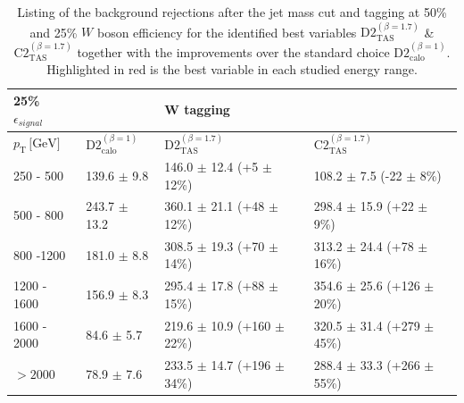 \begin{table}[]
\begin{tabular}{llll}
 \multicolumn{1}{l||}{  \textbf{25\% $\epsilon_{signal}$}} &                                                &  \textbf{W tagging}                                         &                                          \\ \hline
\multicolumn{1}{l||}{$p_{\mathrm{T}} \, \text{[GeV]}$}           & \multicolumn{1}{l|}{$\text{D2}_{\text{calo}}^{(\beta=1)}$} & \multicolumn{1}{l|}{$\text{D2}_{\text{TAS}}^{(\beta=1.7)}$} & \multicolumn{1}{l|}{$\text{C2}_{\text{TAS}}^{(\beta=1.7)}$} \\ \hline \hline
\multicolumn{1}{l||}{250 - 500}                       & \multicolumn{1}{l|}{139.6 $\pm$ 9.8}                     	& \multicolumn{1}{l|}{\cellcolor{Red!50}146.0 $\pm$ 12.4 (+5 $\pm$ 12\%)}         & \multicolumn{1}{l|}{108.2 $\pm$ 7.5 (-22 $\pm$ 8\%)}       \\
\multicolumn{1}{l||}{500 - 800}                       & \multicolumn{1}{l|}{243.7 $\pm$ 13.2}                     	& \multicolumn{1}{l|}{\cellcolor{Red!50}360.1 $\pm$ 21.1 (+48 $\pm$ 12\%)}        & \multicolumn{1}{l|}{298.4 $\pm$ 15.9 (+22 $\pm$ 9\%)}        \\
\multicolumn{1}{l||}{800 -1200}                       & \multicolumn{1}{l|}{181.0 $\pm$ 8.8}                     	& \multicolumn{1}{l|}{308.5 $\pm$ 19.3 (+70 $\pm$ 14\%)}        & \multicolumn{1}{l|}{\cellcolor{Red!50}313.2 $\pm$ 24.4 (+78 $\pm$ 16\%)}       \\
\multicolumn{1}{l||}{1200 - 1600}                     & \multicolumn{1}{l|}{156.9 $\pm$ 8.3}                     	& \multicolumn{1}{l|}{295.4 $\pm$ 17.8 (+88 $\pm$ 15\%)}        & \multicolumn{1}{l|}{\cellcolor{Red!50}354.6 $\pm$ 25.6 (+126 $\pm$ 20\%)}      \\
\multicolumn{1}{l||}{1600 - 2000}                     & \multicolumn{1}{l|}{84.6 $\pm$ 5.7}                      	& \multicolumn{1}{l|}{219.6 $\pm$ 10.9 (+160 $\pm$ 22\%)}       & \multicolumn{1}{l|}{\cellcolor{Red!50}320.5 $\pm$ 31.4 (+279 $\pm$ 45\%)}       \\
\multicolumn{1}{l||}{$>2000$}                         & \multicolumn{1}{l|}{78.9 $\pm$ 7.6}                      	& \multicolumn{1}{l|}{233.5 $\pm$ 14.7 (+196 $\pm$ 34\%)}       & \multicolumn{1}{l|}{\cellcolor{Red!50}288.4 $\pm$ 33.3 (+266 $\pm$ 55\%)}      \\ \hline
\end{tabular}

\caption{Listing of the background rejections after the jet mass cut and tagging at 50\% and 25\% $W$ boson efficiency for the identified best variables $\text{D2}_{\text{TAS}}^{(\beta=1.7)}$ \& $\text{C2}_{\text{TAS}}^{(\beta=1.7)}$ together with the improvements over the standard choice $\text{D2}_{\text{calo}}^{(\beta=1)}$. Highlighted in red is the best variable in each studied energy range.}\label{table:w_improvement}
\end{table}



